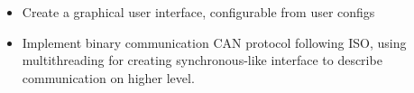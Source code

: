\documentclass[10pt,a4paper,ragged2e,withhyper]{altacv}
\begin{document}
\begin{paracol}{2}

\begin{itemize}
\item Create a graphical user interface, configurable from user configs
\item Implement binary communication CAN protocol following ISO, using multithreading for creating synchronous-like interface to describe communication on higher level.
\end{itemize}
 \\

\divider








\end{paracol}
\end{document}
